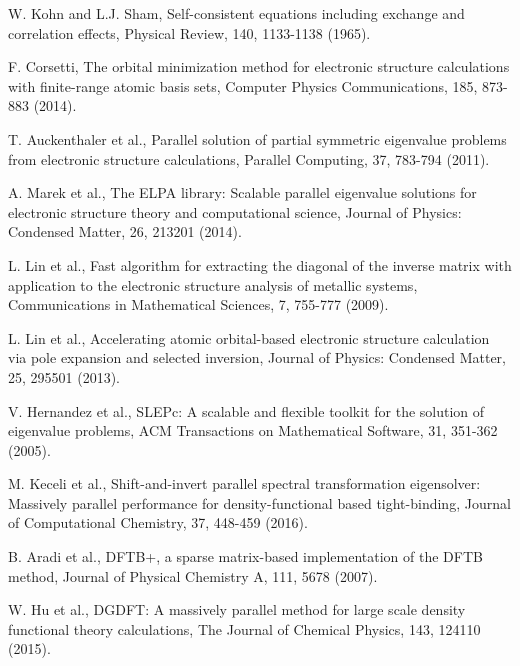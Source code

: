 \documentclass{report}
\begin{document}
\begin{thebibliography}{9}
W. Kohn and L.J. Sham, Self-consistent equations including exchange and correlation effects, Physical Review, 140, 1133-1138 (1965).

F. Corsetti, The orbital minimization method for electronic structure calculations with finite-range atomic basis sets, Computer Physics Communications, 185, 873-883 (2014).

T. Auckenthaler et al., Parallel solution of partial symmetric eigenvalue problems from electronic structure calculations, Parallel Computing, 37, 783-794 (2011).

A. Marek et al., The ELPA library: Scalable parallel eigenvalue solutions for electronic structure theory and computational science, Journal of Physics: Condensed Matter, 26, 213201 (2014).

L. Lin et al., Fast algorithm for extracting the diagonal of the inverse matrix with application to the electronic structure analysis of metallic systems, Communications in Mathematical Sciences, 7, 755-777 (2009).

L. Lin et al., Accelerating atomic orbital-based electronic structure calculation via pole expansion and selected inversion, Journal of Physics: Condensed Matter, 25, 295501 (2013).


V. Hernandez et al., SLEPc: A scalable and flexible toolkit for the solution of eigenvalue problems,
ACM Transactions on Mathematical Software, 31, 351-362 (2005).

M. Keceli et al., Shift-and-invert parallel spectral transformation eigensolver: Massively parallel performance for density-functional based tight-binding, Journal of Computational Chemistry, 37, 448-459 (2016).

B. Aradi et al., DFTB+, a sparse matrix-based implementation of the DFTB method, Journal of Physical Chemistry A, 111, 5678 (2007).

W. Hu et al., DGDFT: A massively parallel method for large scale density functional theory calculations, The Journal of Chemical Physics, 143, 124110 (2015).


\end{thebibliography}
\end{document}
